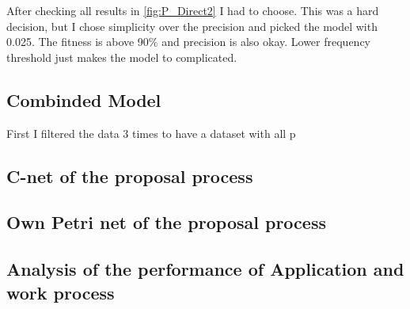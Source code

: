 After checking all results in \ref{fig:P_Direct2} I had to choose.
This was a hard decision, but I chose simplicity over the precision and picked the model with 0.025. The fitness is above 90\% and precision is also okay. Lower frequency threshold just makes the model to complicated.

\subsection*{Combinded Model}
First I filtered the data 3 times to have a dataset with all p


\subsection*{C-net of the proposal process}

\subsection*{Own Petri net of the proposal process}

\subsection*{Analysis of the performance of Application and work process}
